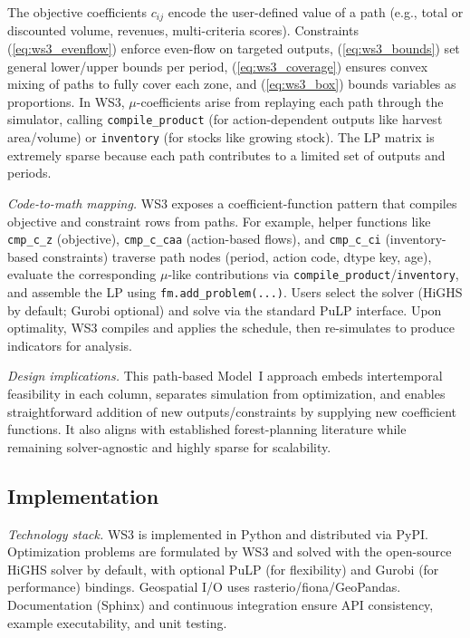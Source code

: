 \documentclass[review]{elsarticle}
\begin{document}
The objective coefficients $c_{ij}$ encode the user-defined value of a path (e.g., total or discounted volume, revenues, multi-criteria scores). Constraints (\ref{eq:ws3_evenflow}) enforce even-flow on targeted outputs, (\ref{eq:ws3_bounds}) set general lower/upper bounds per period, (\ref{eq:ws3_coverage}) ensures convex mixing of paths to fully cover each zone, and (\ref{eq:ws3_box}) bounds variables as proportions. In WS3, $\mu$-coefficients arise from replaying each path through the simulator, calling \texttt{compile\_product} (for action-dependent outputs like harvest area/volume) or \texttt{inventory} (for stocks like growing stock). The LP matrix is extremely sparse because each path contributes to a limited set of outputs and periods.

\emph{Code-to-math mapping.} WS3 exposes a coefficient-function pattern that compiles objective and constraint rows from paths. For example, helper functions like \texttt{cmp\_c\_z} (objective), \texttt{cmp\_c\_caa} (action-based flows), and \texttt{cmp\_c\_ci} (inventory-based constraints) traverse path nodes (period, action code, dtype key, age), evaluate the corresponding $\mu$-like contributions via \texttt{compile\_product}/\texttt{inventory}, and assemble the LP using \texttt{fm.add\_problem(...)}. Users select the solver (HiGHS by default; Gurobi optional) and solve via the standard PuLP interface. Upon optimality, WS3 compiles and applies the schedule, then re-simulates to produce indicators for analysis.

\emph{Design implications.} This path-based Model~I approach embeds intertemporal feasibility in each column, separates simulation from optimization, and enables straightforward addition of new outputs/constraints by supplying new coefficient functions. It also aligns with established forest-planning literature while remaining solver-agnostic and highly sparse for scalability.

\subsection{Implementation} 
\emph{Technology stack.} WS3 is implemented in Python and distributed via PyPI. Optimization problems are formulated by WS3 and solved with the  open-source HiGHS \citep{highs} solver by default, with optional PuLP \citep{pulp} (for flexibility) and Gurobi \citep{gurobi} (for performance) bindings. Geospatial I/O uses rasterio/fiona/GeoPandas. Documentation (Sphinx) and continuous integration ensure API consistency, example executability, and unit testing.
\end{document}
